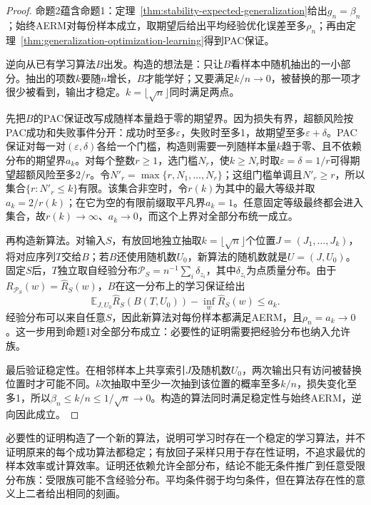 \begin{proof}
命题2蕴含命题1：定理~\ref{thm:stability-expected-generalization}给出$g_n=\beta_n$；始终AERM对每份样本成立，取期望后给出平均经验优化误差至多$\rho_n$；再由定理~\ref{thm:generalization-optimization-learning}得到PAC保证。

逆向从已有学习算法$B$出发。构造的想法是：只让$B$看样本中随机抽出的一小部分。抽出的项数$k$要随$n$增长，$B$才能学好；又要满足$k/n\to0$，被替换的那一项才很少被看到，输出才稳定。$k=\lfloor\sqrt n\rfloor$同时满足两点。

先把$B$的PAC保证改写成随样本量趋于零的期望界。因为损失有界，超额风险按PAC成功和失败事件分开：成功时至多$\varepsilon$，失败时至多1，故期望至多$\varepsilon+\delta$。PAC保证对每一对$(\varepsilon,\delta)$各给一个门槛，构造则需要一列随样本量$k$趋于零、且不依赖分布的期望界$a_k$。对每个整数$r\geq1$，选门槛$N_r$，使$k\geq N_r$时取$\varepsilon=\delta=1/r$可得期望超额风险至多$2/r$。令$N'_r=\max\{r,N_1,\ldots,N_r\}$；这组门槛单调且$N'_r\geq r$，所以集合$\{r:N'_r\leq k\}$有限。该集合非空时，令$r(k)$为其中的最大等级并取$a_k=2/r(k)$；在它为空的有限前缀取平凡界$a_k=1$。任意固定等级最终都会进入集合，故$r(k)\to\infty$、$a_k\to0$，而这个上界对全部分布统一成立。

再构造新算法。对输入$S$，有放回地独立抽取$k=\lfloor\sqrt n\rfloor$个位置$J=(J_1,\ldots,J_k)$，将对应序列$T$交给$B$；若$B$还使用随机数$U_0$，新算法的随机数就是$U=(J,U_0)$。固定$S$后，$T$独立取自经验分布$\mathcal P_S=n^{-1}\sum_i\delta_{z_i}$，其中$\delta_{z_i}$为点质量分布。由于$R_{\mathcal P_S}(w)=\hat R_S(w)$，$B$在这一分布上的学习保证给出
\[
 \mathbb E_{J,U_0}\hat R_S(B(T,U_0))-\inf_w\hat R_S(w)\leq a_k.
\]
经验分布可以来自任意$S$，因此新算法对每份样本都满足AERM，且$\rho_n=a_k\to0$。这一步用到命题1对全部分布成立：必要性的证明需要把经验分布也纳入允许族。

最后验证稳定性。在相邻样本上共享索引$J$及随机数$U_0$，两次输出只有访问被替换位置时才可能不同。$k$次抽取中至少一次抽到该位置的概率至多$k/n$，损失变化至多1，所以$\beta_n\leq k/n\leq1/\sqrt n\to0$。构造的算法同时满足稳定性与始终AERM，逆向因此成立。
\end{proof}

必要性的证明构造了一个新的算法，说明可学习时存在一个稳定的学习算法，并不证明原来的每个成功算法都稳定；有放回子采样只用于存在性证明，不追求最优的样本效率或计算效率。证明还依赖允许全部分布，结论不能无条件推广到任意受限分布族：受限族可能不含经验分布。平均条件弱于均匀条件，但在算法存在性的意义上二者给出相同的刻画。

